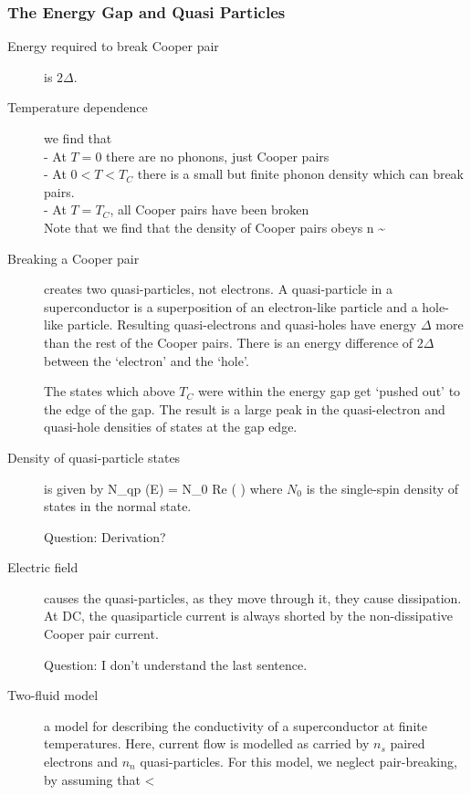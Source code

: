 \subsubsection{The Energy Gap and Quasi Particles}
\begin{description}

\item[Energy required to break Cooper pair] is $2\Delta$. 

\item[Temperature dependence] we find that\\
- At $T = 0$ there are no phonons, just Cooper pairs \\
- At $0 < T< T_C$ there is a small but finite phonon density which can break pairs.  \\
- At $T = T_C$, all Cooper pairs have been broken \\

Note that we find that the density of Cooper pairs obeys
\beq
n \sim {}
\eeq

\item[Breaking a Cooper pair] creates two quasi-particles, not electrons. A quasi-particle in a superconductor is a superposition of an electron-like particle and a hole-like particle. Resulting quasi-electrons and quasi-holes have energy $\Delta $ more than the rest of the Cooper pairs. There is an energy difference of $2\Delta$ between the `electron' and the `hole'. 

The states which above $T_C$ were within the energy gap get `pushed out' to the edge of the gap. The result is a large peak in the quasi-electron and quasi-hole densities of states at the gap edge.  

\item[Density of quasi-particle states] is given by
\beq
N_{qp} (E) = N_0 \mbox{Re} \left( \right)
\eeq
where $N_0$ is the single-spin density of states in the normal state. 

Question: Derivation?

\item[Electric field] causes the quasi-particles, as they move through it, they cause dissipation. At DC, the quasiparticle current is always shorted by the non-dissipative Cooper pair current. 

Question: I don't understand the last sentence. 

\item[Two-fluid model] a model for describing the conductivity of a superconductor at finite temperatures. Here, current flow is modelled as carried by $n_s$ paired electrons and $n_n$ quasi-particles. For this model, we neglect pair-breaking, by assuming that 
\beq
\frac{\omega}{2\pi} < 
\eeq


\end{description}
